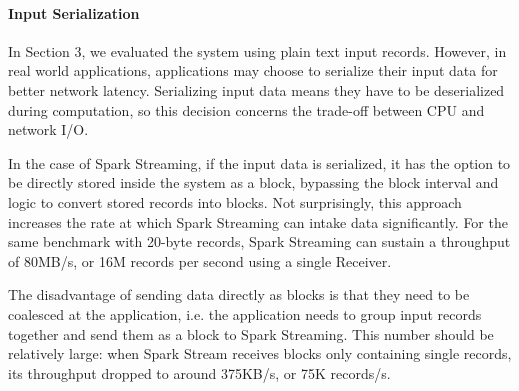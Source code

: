 \paragraph{Input Serialization}
In Section 3, we evaluated the system using plain text input records. However, in real world applications, applications may choose to serialize their input data for better network latency. Serializing input data means they have to be deserialized during computation, so this decision concerns the trade-off between CPU and network I/O.

In the case of Spark Streaming, if the input data is serialized, it has the option to be directly stored inside the system as a block, bypassing the block interval and logic to convert stored records into blocks. Not surprisingly, this approach increases the rate at which Spark Streaming can intake data significantly. For the same benchmark with 20-byte records, Spark Streaming can sustain a throughput of 80MB/s, or 16M records per second using a single Receiver.

The disadvantage of sending data directly as blocks is that they need to be coalesced at the application, i.e. the application needs to group input records together and send them as a block to Spark Streaming. This number should be relatively large: when Spark Stream receives blocks only containing single records, its throughput dropped to around 375KB/s, or 75K records/s.




